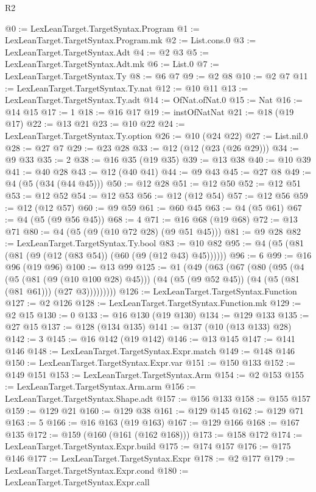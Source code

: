\begin{lexlean}{R2}
\begin{coremodule}
@0 := LexLeanTarget.TargetSyntax.Program
@1 := LexLeanTarget.TargetSyntax.Program.mk
@2 := List.cons.{0}
@3 := LexLeanTarget.TargetSyntax.Adt
@4 := @2 @3
@5 := LexLeanTarget.TargetSyntax.Adt.mk
@6 := List.{0}
@7 := LexLeanTarget.TargetSyntax.Ty
@8 := @6 @7
@9 := @2 @8
@10 := @2 @7
@11 := LexLeanTarget.TargetSyntax.Ty.nat
@12 := @10 @11
@13 := LexLeanTarget.TargetSyntax.Ty.adt
@14 := OfNat.ofNat.{0}
@15 := Nat
@16 := @14 @15
@17 := 1
@18 := @16 @17
@19 := instOfNatNat
@21 := @18 (@19 @17)
@22 := @13 @21
@23 := @10 @22
@24 := LexLeanTarget.TargetSyntax.Ty.option
@26 := @10 (@24 @22)
@27 := List.nil.{0}
@28 := @27 @7
@29 := @23 @28
@33 := @12 (@12 (@23 (@26 @29)))
@34 := @9 @33
@35 := 2
@38 := @16 @35 (@19 @35)
@39 := @13 @38
@40 := @10 @39
@41 := @40 @28
@43 := @12 (@40 @41)
@44 := @9 @43
@45 := @27 @8
@49 := @4 (@5 (@34 (@44 @45)))
@50 := @12 @28
@51 := @12 @50
@52 := @12 @51
@53 := @12 @52
@54 := @12 @53
@56 := @12 (@12 @54)
@57 := @12 @56
@59 := @12 (@12 @57)
@60 := @9 @59
@61 := @60 @45
@63 := @4 (@5 @61)
@67 := @4 (@5 (@9 @56 @45))
@68 := 4
@71 := @16 @68 (@19 @68)
@72 := @13 @71
@80 := @4 (@5 (@9 (@10 @72 @28) (@9 @51 @45)))
@81 := @9 @28
@82 := LexLeanTarget.TargetSyntax.Ty.bool
@83 := @10 @82
@95 := @4 (@5 (@81 (@81 (@9 (@12 (@83 @54)) (@60 (@9 (@12 @43) @45))))))
@96 := 6
@99 := @16 @96 (@19 @96)
@100 := @13 @99
@125 := @1
    (@49
      (@63
        (@67
          (@80
            (@95
              (@4
                (@5 (@81 (@9 (@10 @100 @28) @45)))
                (@4 (@5 (@9 @52 @45)) (@4 (@5 (@81 (@81 @61))) (@27 @3)))))))))
@126 := LexLeanTarget.TargetSyntax.Function
@127 := @2 @126
@128 := LexLeanTarget.TargetSyntax.Function.mk
@129 := @2 @15
@130 := 0
@133 := @16 @130 (@19 @130)
@134 := @129 @133
@135 := @27 @15
@137 := @128 (@134 @135)
@141 := @137 (@10 (@13 @133) @28)
@142 := 3
@145 := @16 @142 (@19 @142)
@146 := @13 @145
@147 := @141 @146
@148 := LexLeanTarget.TargetSyntax.Expr.match
@149 := @148 @146
@150 := LexLeanTarget.TargetSyntax.Expr.var
@151 := @150 @133
@152 := @149 @151
@153 := LexLeanTarget.TargetSyntax.Arm
@154 := @2 @153
@155 := LexLeanTarget.TargetSyntax.Arm.arm
@156 := LexLeanTarget.TargetSyntax.Shape.adt
@157 := @156 @133
@158 := @155 @157
@159 := @129 @21
@160 := @129 @38
@161 := @129 @145
@162 := @129 @71
@163 := 5
@166 := @16 @163 (@19 @163)
@167 := @129 @166
@168 := @167 @135
@172 := @159 (@160 (@161 (@162 @168)))
@173 := @158 @172
@174 := LexLeanTarget.TargetSyntax.Expr.build
@175 := @174 @157
@176 := @175 @146
@177 := LexLeanTarget.TargetSyntax.Expr
@178 := @2 @177
@179 := LexLeanTarget.TargetSyntax.Expr.cond
@180 := LexLeanTarget.TargetSyntax.Expr.call

\end{coremodule}
\end{lexlean}
